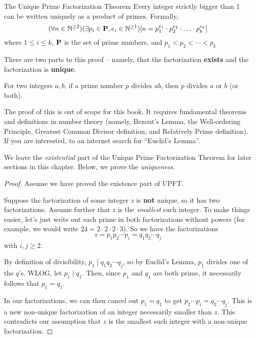 \documentclass[main.tex]{subfiles}
\begin{document}
\begin{thm}{The Unique Prime Factorization Theorem }
	Every integer strictly bigger than 1 can be written uniquely as a product of primes. Formally, 
	\[(\forall n \in \N^{\geq 2})(\exists p_i \in \P, e_i \in \N^{\geq 1})[n = p_1^{e_1} \cdot p_2^{e_2} \cdot \dotsc \cdot p_k^{e_k}]\]
	where \(1 \leq i \leq k\), \(\P\) is the set of prime numbers, and \(p_1 < p_2 < \cdots < p_k\)
\end{thm}

There are two parts to this proof -- namely, that the factorization \textbf{exists} and the factorization is \textbf{unique}.

\begin{prop}
	For two integers \(a,b\), if a prime number \(p\) divides \(ab\), then \(p\) divides \(a\) or \(b\) (or both).
\end{prop}

The proof of this is out of scope for this book. It requires fundamental theorems and definitions in number theory (namely, Bezout's Lemma, the Well-ordering Principle, Greatest Common Divisor definition, and Relatively Prime definition). If you are interested, to an internet search for ``Euclid's Lemma''.

We leave the \textit{existential} part of the Unique Prime Factorization Theorem for later sections in this chapter. Below, we prove the \textit{uniqueness}.

\begin{proof}
	Assume we have proved the existence part of UPFT.
	
	Suppose the factorization of some integer \(z\) is \textbf{not} unique, so it has two factorizations. Assume further that \(z\) is the \textit{smallest} such integer. To make things easier, let's just write out each prime in both factorizations without powers (for example, we would write \(24 = 2 \cdot 2 \cdot 2 \cdot 3\)). So we have the factorizations \[z = p_1 p_2 \cdots p_i = q_1 q_2 \cdots q_j\]
	with \(i,j \geq 2\).
	
	By definition of divisibility, \(p_1 \mid q_1 q_2 \cdots q_j\), so by Euclid's Lemma, \(p_1\) divides one of the \(q\)'s. WLOG, let \(p_1 \mid q_1\). Then, since \(p_1\) and \(q_1\) are both prime, it necessarily follows that \(p_1 = q_1\).
	
	In our factorizations, we can then cancel out \(p_1 = q_1\) to get \(p_2 \cdots p_i = q_2 \cdots q_j\). This is a new non-unique factorization of an integer necessarily smaller than \(z\). This contradicts our assumption that \(z\) is the smallest such integer with a non-unique factorization.
\end{proof}
\end{document}
